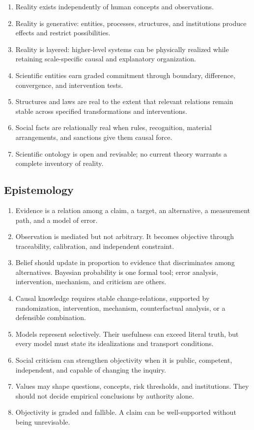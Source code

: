 \begin{enumerate}
\item Reality exists independently of human concepts and observations.
\item Reality is generative: entities, processes, structures, and institutions
produce effects and restrict possibilities.
\item Reality is layered: higher-level systems can be physically realized while
retaining scale-specific causal and explanatory organization.
\item Scientific entities earn graded commitment through boundary, difference,
convergence, and intervention tests.
\item Structures and laws are real to the extent that relevant relations remain
stable across specified transformations and interventions.
\item Social facts are relationally real when rules, recognition, material
arrangements, and sanctions give them causal force.
\item Scientific ontology is open and revisable; no current theory warrants a
complete inventory of reality.
\end{enumerate}

\subsection{Epistemology}

\begin{enumerate}
\item Evidence is a relation among a claim, a target, an alternative, a
measurement path, and a model of error.
\item Observation is mediated but not arbitrary. It becomes objective through
traceability, calibration, and independent constraint.
\item Belief should update in proportion to evidence that discriminates among
alternatives. Bayesian probability is one formal tool; error analysis,
intervention, mechanism, and criticism are others.
\item Causal knowledge requires stable change-relations, supported by
randomization, intervention, mechanism, counterfactual analysis, or a
defensible combination.
\item Models represent selectively. Their usefulness can exceed literal truth,
but every model must state its idealizations and transport conditions.
\item Social criticism can strengthen objectivity when it is public,
competent, independent, and capable of changing the inquiry.
\item Values may shape questions, concepts, risk thresholds, and institutions.
They should not decide empirical conclusions by authority alone.
\item Objectivity is graded and fallible. A claim can be well-supported without
being unrevisable.
\end{enumerate}

